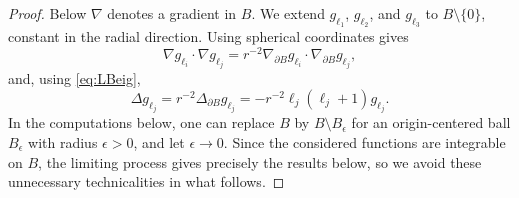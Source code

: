 \documentclass[reqno]{amsart}
\numberwithin{equation}{section}
\numberwithin{figure}{section}
\numberwithin{table}{section}
\theoremstyle{plain}
\theoremstyle{definition}
\theoremstyle{remark}
\begin{document}
\begin{proof}
    Below $\nabla$ denotes a gradient in $B$. We extend $g_{\ell_1}$, $g_{\ell_2}$, and $g_{\ell_3}$ to $B\setminus\{0\}$, constant in the radial direction. Using spherical coordinates gives
    \begin{equation} \label{eq:gip}
        \nabla g_{\ell_i}\cdot\nabla g_{\ell_j} = r^{-2}\nabla_{\partial B} g_{\ell_i}\cdot \nabla_{\partial B} g_{\ell_j},
    \end{equation}
    and, using \eqref{eq:LBeig},
    \begin{equation} \label{eq:deltag}
        \Delta g_{\ell_j} = r^{-2} \Delta_{\partial B} g_{\ell_j} = -r^{-2}\ell_j (\ell_j + 1) g_{\ell_j}.
    \end{equation}
    In the computations below, one can replace $B$ by $B\setminus B_\epsilon$ for an origin-centered ball $B_\epsilon$ with radius $\epsilon>0$, and let $\epsilon\to 0$. Since the considered functions are integrable on $B$, the limiting process gives precisely the results below, so we avoid these unnecessary technicalities in what follows. 
    	

\end{proof}
\end{document}
